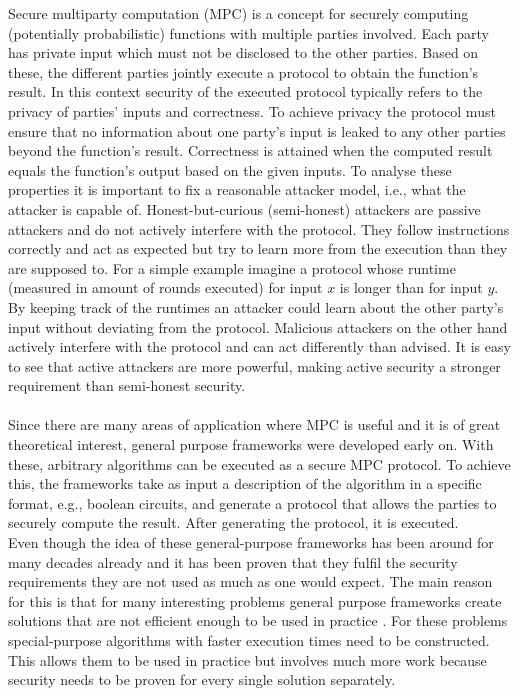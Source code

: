 Secure multiparty computation (MPC) is a concept for securely computing (potentially probabilistic) functions with multiple parties involved. Each party has private input which must not be disclosed to the other parties. Based on these, the different parties jointly execute a protocol to obtain the function's result. In this context security of the executed protocol typically refers to the privacy of parties' inputs and correctness. To achieve privacy the protocol must ensure that no information about one party's input is leaked to any other parties beyond the function's result. Correctness is attained when the computed result equals the function's output based on the given inputs. To analyse these properties it is important to fix a reasonable attacker model, i.e., what the attacker is capable of. Honest-but-curious (semi-honest) attackers are passive attackers and do not actively interfere with the protocol. They follow instructions correctly and act as expected but try to learn more from the execution than they are supposed to. For a simple example imagine a protocol whose runtime (measured in amount of rounds executed) for input $x$ is longer than for input $y$. By keeping track of the runtimes an attacker could learn about the other party's input without deviating from the protocol. Malicious attackers on the other hand actively interfere with the protocol and can act differently than advised. It is easy to see that active attackers are more powerful, making active security a stronger requirement than semi-honest security.\\
\ \\Since there are many areas of application where MPC is useful and it is of great theoretical interest, general purpose frameworks were developed early on. With these, arbitrary algorithms can be executed as a secure MPC protocol. To achieve this, the frameworks take as input a description of the algorithm in a specific format, e.g., boolean circuits, and generate a protocol that allows the parties to securely compute the result. After generating the protocol, it is executed.\\ 
Even though the idea of these general-purpose frameworks has been around for many decades already and it has been proven that they fulfil the security requirements they are not used as much as one would expect. The main reason for this is that for many interesting problems general purpose frameworks create solutions that are not efficient enough to be used in practice \citep{sok, mpusp, htpamg, htgaes}. For these problems special-purpose algorithms with faster execution times need to be constructed. This allows them to be used in practice but involves much more work because security needs to be proven for every single solution separately. \\
